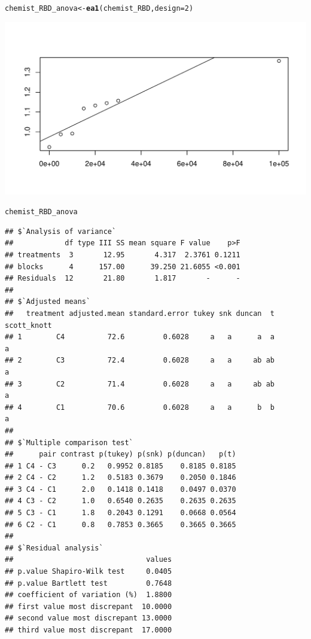 \documentclass[a4paper]{article}\usepackage{graphicx, color}
\makeatletter
\def\maxwidth{ %
  \ifdim\Gin@nat@width>\linewidth
    \linewidth
  \else
    \Gin@nat@width
  \fi
}
\newcommand{\hlfunctioncall}[1]{\textcolor[rgb]{0.501960784313725,0,0.329411764705882}{\textbf{#1}}}%
\newenvironment{kframe}{%
 \def\at@end@of@kframe{}%
 \ifinner\ifhmode%
  \def\at@end@of@kframe{\end{minipage}}%
  \begin{minipage}{\columnwidth}%
 \fi\fi%
 \def\FrameCommand##1{\hskip\@totalleftmargin \hskip-\fboxsep
 \colorbox{shadecolor}{##1}\hskip-\fboxsep
     \hskip-\linewidth \hskip-\@totalleftmargin \hskip\columnwidth}%
 \MakeFramed {\advance\hsize-\width
   \@totalleftmargin\z@ \linewidth\hsize
   \@setminipage}}%
 {\par\unskip\endMakeFramed%
 \at@end@of@kframe}
\newenvironment{knitrout}{}{} %
\makeatother
\begin{document}
\begin{knitrout}
\begin{kframe}
{\ttfamily\noindent\itshape\color{messagecolor}{\#\# The following object is masked from 'package:lme4':\\\#\# \\\#\#\ \ \ \  lmList}}\begin{alltt}
chemist_RBD_anova <- \hlfunctioncall{ea1}(chemist_RBD, design = 2)
\end{alltt}
\end{kframe}
\includegraphics[width=\maxwidth]{figure/unnamed-chunk-2} 
\begin{kframe}\begin{alltt}
chemist_RBD_anova
\end{alltt}
\begin{verbatim}
## $`Analysis of variance`
##            df type III SS mean square F value    p>F
## treatments  3       12.95       4.317  2.3761 0.1211
## blocks      4      157.00      39.250 21.6055 <0.001
## Residuals  12       21.80       1.817       -      -
## 
## $`Adjusted means`
##   treatment adjusted.mean standard.error tukey snk duncan  t scott_knott
## 1        C4          72.6         0.6028     a   a      a  a           a
## 2        C3          72.4         0.6028     a   a     ab ab           a
## 3        C2          71.4         0.6028     a   a     ab ab           a
## 4        C1          70.6         0.6028     a   a      b  b           a
## 
## $`Multiple comparison test`
##      pair contrast p(tukey) p(snk) p(duncan)   p(t)
## 1 C4 - C3      0.2   0.9952 0.8185    0.8185 0.8185
## 2 C4 - C2      1.2   0.5183 0.3679    0.2050 0.1846
## 3 C4 - C1      2.0   0.1418 0.1418    0.0497 0.0370
## 4 C3 - C2      1.0   0.6540 0.2635    0.2635 0.2635
## 5 C3 - C1      1.8   0.2043 0.1291    0.0668 0.0564
## 6 C2 - C1      0.8   0.7853 0.3665    0.3665 0.3665
## 
## $`Residual analysis`
##                               values
## p.value Shapiro-Wilk test     0.0405
## p.value Bartlett test         0.7648
## coefficient of variation (%)  1.8800
## first value most discrepant  10.0000
## second value most discrepant 13.0000
## third value most discrepant  17.0000
\end{verbatim}
\begin{alltt}

\end{alltt}
\end{kframe}
\end{knitrout}
\end{document}
